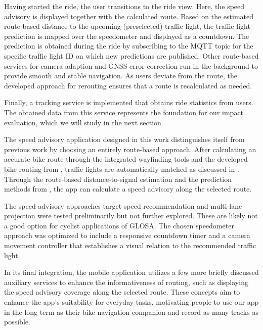 Having started the ride, the user transitions to the ride view. Here, the speed advisory is displayed together with the calculated route. Based on the estimated route-based distance to the upcoming (preselected) traffic light, the traffic light prediction is mapped over the speedometer and displayed as a countdown. The prediction is obtained during the ride by subscribing to the MQTT topic for the specific traffic light ID on which new predictions are published. Other route-based services for camera adaption and GNSS error correction run in the background to provide smooth and stable navigation. As users deviate from the route, the developed approach for rerouting ensures that a route is recalculated as needed. 

Finally, a tracking service is implemented that obtains ride statistics from users. The obtained data from this service represents the foundation for our impact evaluation, which we will study in the next section.

\begin{Summary}
The speed advisory application designed in this work distinguishes itself from previous work by choosing an entirely route-based approach. After calculating an accurate bike route through the integrated wayfinding tools and the developed bike routing from , traffic lights are automatically matched as discussed in . Through the route-based distance-to-signal estimation and the prediction methods from , the app can calculate a speed advisory along the selected route. 

The speed advisory approaches target speed recommendation and multi-lane projection were tested preliminarily but not further explored. These are likely not a good option for cyclist applications of GLOSA. The chosen speedometer approach was optimized to include a responsive countdown timer and a camera movement controller that establishes a visual relation to the recommended traffic light. 

In its final integration, the mobile application utilizes a few more briefly discussed auxiliary services to enhance the informativeness of routing, such as displaying the speed advisory coverage along the selected route. These concepts aim to enhance the app's suitability for everyday tasks, motivating people to use our app in the long term as their bike navigation companion and record as many tracks as possible.
\end{Summary}

